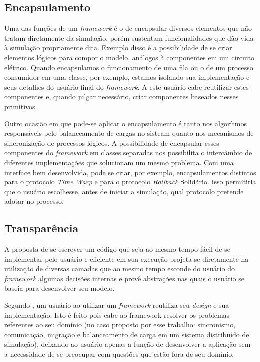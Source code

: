 \subsection{Encapsulamento}

Uma das funções de um \textit{framework} é o de encapsular diversos elementos que não tratam diretamente da simulação, porém sustentam funcionalidades que dão vida à simulação propriamente dita. Exemplo disso é a possibilidade de se criar elementos lógicos para compor o modelo, análogos à componentes em um circuito elétrico. Quando encapsulamos o funcionamento de uma fila ou o de um processo consumidor em uma classe, por exemplo, estamos isolando sua implementação e seus detalhes do usuário final do \textit{framework}. A este usuário cabe reutilizar estes componentes e, quando julgar necessário, criar componentes baseados nesses primitivos.

Outro ocasião em que pode-se aplicar o encapsulamento é tanto nos algorítmos responsáveis pelo balanceamento de cargas no sisteam quanto nos mecanismos de sincronização de processos lógicos. A possibilidade de encapsular esses componentes do \textit{framework} em classes separadas nos possibilita o intercâmbio de diferentes implementações que solucionam um mesmo problema. Com uma interface bem desenvolvida, pode se criar, por exemplo, encapsulamentos distintos para o protocolo \textit{Time Warp} e para o protocolo \textit{Rollback} Solidário. Isso permitiria que o usuário escolhesse, antes de iniciar a simulação, qual protocolo pretende adotar no processo.

\subsection{Transparência}

A proposta de se escrever um código que seja ao mesmo tempo fácil de se implementar pelo usuário e eficiente em sua execução projeta-se diretamente na utilização de diversas camadas que ao mesmo tempo esconde do usuário do \textit{framework} algumas decisões internas e provê abstrações nas quais o usuário se baseia para desenvolver seu modelo.

Segundo \cite{DIRK00}, um usuário ao utilizar um \textit{framework} reutiliza seu \textit{design} e sua implementação. Isto é feito pois cabe ao framework resolver os problemas referentes ao seu domínio (no caso proposto por esse trabalho: sincronismo, comunicação, migração e balanceamento de carga em um sistema distribuído de simulação), deixando ao usuário apenas a função de desenvolver a aplicação sem a necessidade de se preocupar com questões que estão fora de seu domínio.

